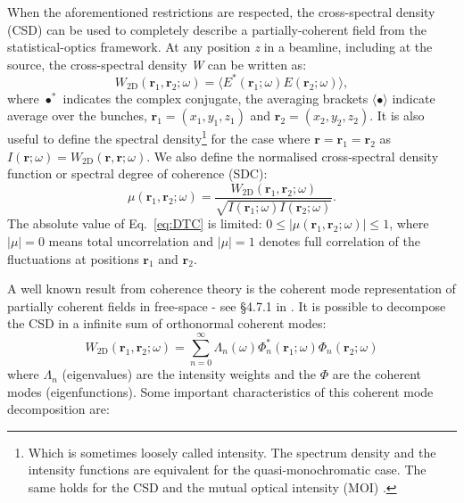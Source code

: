 \documentclass{iucr}              %
\begin{document}
When the aforementioned restrictions are respected, the cross-spectral density (CSD) can be used to completely describe a partially-coherent field from the statistical-optics framework. At any position \textit{z} in a beamline, including at the source, the cross-spectral density \textit{W} can be written as:
\begin{equation}
W_\text{2D}(\textbf{r}_1,\textbf{r}_2;\omega) = \big\langle E^*(\textbf{r}_1;\omega)  E(\textbf{r}_2;\omega)\big\rangle,
\label{eq:CSD_2D}
\end{equation}
where $\bullet^*$ indicates the complex conjugate, the averaging brackets $\langle \bullet \rangle$ indicate average over the bunches, $\textbf{r}_1=(x_1,y_1,z_1)$ and $\textbf{r}_2=(x_2,y_2,z_2)$. It is also useful to define the spectral density\footnote{Which is sometimes loosely called intensity. The spectrum density and the intensity functions are equivalent for the quasi-monochromatic case. The same holds for the CSD and the mutual optical intensity (MOI) \cite{mandel_wolf}.} for the case where $\textbf{r}=\textbf{r}_1=\textbf{r}_2$ as $I(\textbf{r};\omega)=W_\text{2D}(\textbf{r},\textbf{r};\omega)$. We also define the normalised cross-spectral density function or spectral degree of coherence (SDC):
\begin{equation}
\mu(\textbf{r}_1,\textbf{r}_2;\omega) = \frac{W_\text{2D}(\textbf{r}_1,\textbf{r}_2;\omega)}{\sqrt{I(\textbf{r}_1;\omega) I(\textbf{r}_2;\omega)}}.
\label{eq:DTC}
\end{equation}
The absolute value of Eq.~\ref{eq:DTC} is limited: $0\leq|\mu(\textbf{r}_1,\textbf{r}_2;\omega)|\leq 1$, where $|\mu|=0$ means total uncorrelation and $|\mu|=1$ denotes full correlation of the fluctuations at positions $\textbf{r}_1$ and $\textbf{r}_2$.

A well known result from coherence theory is the coherent mode representation of partially coherent fields in free-space - see §4.7.1 in \cite{mandel_wolf}. It is possible to decompose the CSD in a infinite sum of orthonormal coherent modes:
\begin{equation}
W_\text{2D}(\textbf{r}_1,\textbf{r}_2;\omega) = \sum_{n=0}^{\infty} \Lambda_n(\omega) \Phi_{n}^*(\textbf{r}_1;\omega) \Phi_{n}(\textbf{r}_2;\omega) 
\label{eq:CMD}
\end{equation}
where $\Lambda_n$ (eigenvalues) are the intensity weights and the $\Phi$ are the coherent modes (eigenfunctions). 
Some important characteristics of this coherent mode decomposition are: 
\end{document}
